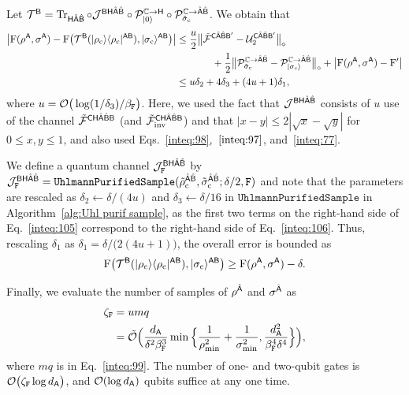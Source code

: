 Let ${\mathcal{T}}^{{\mathsf{B}}}= \operatorname{Tr}_{{\mathsf{H}}\hat{{\mathsf{A}}}\hat{{\mathsf{B}}}}\circ{\mathcal{J}}^{{\mathsf{B}}{\mathsf{H}}\hat{{\mathsf{A}}}\hat{{\mathsf{B}}}}\circ{\mathcal{P}}_{|0\rangle}^{\mathbb{C}\rightarrow{\mathsf{H}}}\circ{\mathcal{P}}_{\tilde{\sigma}_{\rm c}}^{\mathbb{C}\rightarrow\hat{{\mathsf{A}}}\hat{{\mathsf{B}}}}$. We obtain that
\begin{align}
    \big|\rF(\rho^\sA, \sigma^\sA) - \rF\big(\cT^{\sB}(\ketbra{\rho_{\rm c}}{\rho_{\rm c}}^{\sA\sB}), \ket{\sigma_{\rm c}}^{\sA\sB}\big)\big| 
    &\leq \f{u}{2}\big\|\til{\cF}^{\sC\hat{\sA}\hat{\sB}\sB'} - \cU_2^{\sC\hat{\sA}\hat{\sB}\sB'}\big\|_\diamond \notag\\
    &\hspace{3pc}+ \f{1}{2}\big\|\cP_{\til{\sigma}_{\rm c}}^{\bC\rarr\hat{\sA}\hat{\sB}} - \cP_{\ket{\sigma_{\rm c}}}^{\bC\rarr\hat{\sA}\hat{\sB}}\big\|_\diamond 
    + \big|\rF(\rho^\sA, \sigma^\sA) - \rF'\big| \\
    \label{inteq:105}
    &\leq u\delta_2 + 4\delta_3 +  (4u+1)\delta_1,
\end{align}
where $u = {\mathcal{O}}\big(\log(1/\delta_3)/\beta_{\mathtt{F}}\big)$.
Here, we used the fact that ${\mathcal{J}}^{{\mathsf{B}}{\mathsf{H}}\hat{{\mathsf{A}}}\hat{{\mathsf{B}}}}$ consists of $u$ use of the channel $\tilde{{\mathcal{F}}}^{{\mathsf{C}}{\mathsf{H}}\hat{{\mathsf{A}}}\hat{{\mathsf{B}}}{\mathsf{B}}}$ (and $\tilde{{\mathcal{F}}}_{\rm inv}^{{\mathsf{C}}{\mathsf{H}}\hat{{\mathsf{A}}}\hat{{\mathsf{B}}}{\mathsf{B}}}$) and that $|x-y|\leq 2 |\sqrt{x} - \sqrt{y}|$ for $0 \leq x, y \leq 1$, and also used Eqs.~\eqref{inteq:98},~$\eqref{inteq:97}$, and~\eqref{inteq:77}.

We define a quantum channel ${\mathcal{J}}_{\mathtt{F}}^{{\mathsf{B}}{\mathsf{H}}\hat{{\mathsf{A}}}\hat{{\mathsf{B}}}}$ by ${\mathcal{J}}_{\mathtt{F}}^{{\mathsf{B}}{\mathsf{H}}\hat{{\mathsf{A}}}\hat{{\mathsf{B}}}} = \mathtt{UhlmannPurifiedSample}(\tilde{\rho}_{\rm c}^{\hat{{\mathsf{A}}}\hat{{\mathsf{B}}}}, \tilde{\sigma}_{\rm c}^{\hat{{\mathsf{A}}}\hat{{\mathsf{B}}}}; \delta/2, \mathtt{F})$ and note that the parameters are rescaled as $\delta_2 \gets \delta/(4u)$ and $\delta_3 \gets \delta/16$ in $\mathtt{UhlmannPurifiedSample}$ in Algorithm~\ref{alg:Uhl purif sample}, as the first two terms on the right-hand side of Eq.~\eqref{inteq:105} correspond to the right-hand side of Eq.~\eqref{inteq:106}.
Thus, rescaling $\delta_1$ as $\delta_1 = \delta/\big(2(4u+1)\big)$, the overall error is bounded as
\begin{align}
     {\mathrm{F}}\big({\mathcal{T}}^{{\mathsf{B}}}(|\rho_{\rm c}\rangle\langle\rho_{\rm c}|^{{\mathsf{A}}{\mathsf{B}}}), |\sigma_{\rm c}\rangle^{{\mathsf{A}}{\mathsf{B}}}\big) \geq {\mathrm{F}}(\rho^{\mathsf{A}}, \sigma^{\mathsf{A}}) - \delta.
\end{align}

Finally, we evaluate the number of samples of $\rho^{\hat{{\mathsf{A}}}}$ and $\sigma^{\hat{{\mathsf{A}}}}$ as 
\begin{align}
    \zeta_{\mathtt{F}} 
    &= umq \\
    &=\tilde{{\mathcal{O}}}\Big(\frac{d_{\mathsf{A}}}{\delta^2\beta_{\mathtt{F}}^3}\min\Big\{\frac{1}{\rho_{\rm min}^2} + \frac{1}{\sigma_{\rm min}^2}, \frac{d_{\mathsf{A}}^2}{\beta_{\mathtt{F}}^4\delta^4}\Big\}\Big),
\end{align}
where $mq$ is in Eq.~\eqref{inteq:99}.
The number of one- and two-qubit gates is
${\mathcal{O}}\big(\zeta_{\mathtt{F}} \log{d_{\mathsf{A}}}\big)$, and ${\mathcal{O}}(\log{d_{\mathsf{A}}})$ qubits suffice at any one time.







